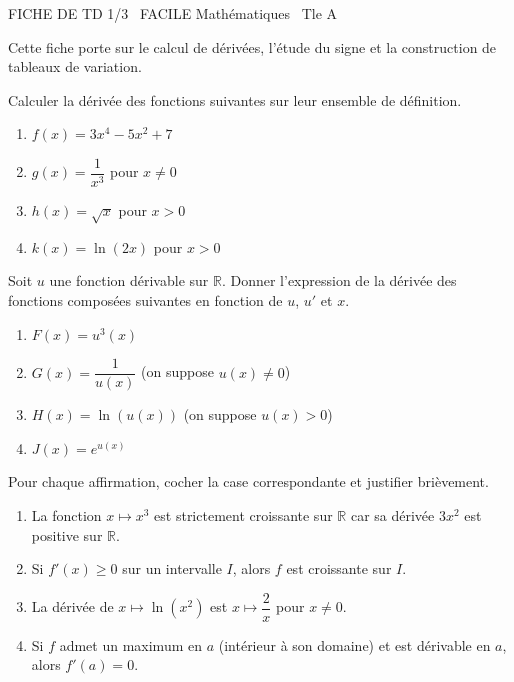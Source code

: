 \documentclass[11pt]{article}
\begin{document}
\begin{tcolorbox}[enhanced,colback=popink,colframe=popink,arc=10pt,boxrule=0pt,left=12pt,right=12pt,top=9pt,bottom=9pt]
{\color{white}\popxbold\small FICHE DE TD 1/3 \textbullet\ FACILE \hfill Mathématiques \textbullet\ Tle A\par}
\end{tcolorbox}
\vspace{4pt}
Cette fiche porte sur le calcul de dérivées, l'étude du signe et la construction de tableaux de variation.

\begin{exercice}
Calculer la dérivée des fonctions suivantes sur leur ensemble de définition.
\begin{enumerate}
    \item $f(x) = 3x^4 - 5x^2 + 7$
    \item $g(x) = \dfrac{1}{x^3}$ pour $x \neq 0$
    \item $h(x) = \sqrt{x}$ pour $x > 0$
    \item $k(x) = \ln(2x)$ pour $x > 0$
\end{enumerate}
\end{exercice}

\begin{exercice}
Soit $u$ une fonction dérivable sur $\mathbb{R}$. Donner l'expression de la dérivée des fonctions composées suivantes en fonction de $u$, $u'$ et $x$.
\begin{enumerate}
    \item $F(x) = u^3(x)$
    \item $G(x) = \dfrac{1}{u(x)}$ (on suppose $u(x) \neq 0$)
    \item $H(x) = \ln(u(x))$ (on suppose $u(x) > 0$)
    \item $J(x) = e^{u(x)}$
\end{enumerate}
\end{exercice}

\begin{exercice}
Pour chaque affirmation, cocher la case correspondante et justifier brièvement.
\begin{enumerate}
    \item La fonction $x \mapsto x^3$ est strictement croissante sur $\mathbb{R}$ car sa dérivée $3x^2$ est positive sur $\mathbb{R}$.
    \item Si $f'(x) \geq 0$ sur un intervalle $I$, alors $f$ est croissante sur $I$.
    \item La dérivée de $x \mapsto \ln(x^2)$ est $x \mapsto \dfrac{2}{x}$ pour $x \neq 0$.
    \item Si $f$ admet un maximum en $a$ (intérieur à son domaine) et est dérivable en $a$, alors $f'(a) = 0$.
\end{enumerate}
\end{exercice}
\end{document}
